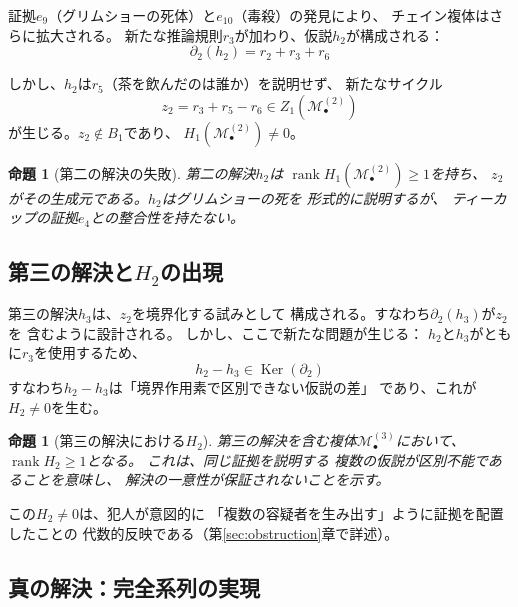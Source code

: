 \documentclass[12pt,twocolumn]{ltjsarticle}
\newtheorem{proposition}[theorem]{命題}
\newcommand{\Ker}{\operatorname{Ker}}
\renewcommand{\rank}{\operatorname{rank}}
\newcommand{\Mys}{\mathcal{M}}
\begin{document}
証拠$e_9$（グリムショーの死体）と$e_{10}$（毒殺）の発見により、
チェイン複体はさらに拡大される。
新たな推論規則$r_3$が加わり、仮説$h_2$が構成される：
\begin{equation}
\partial_2(h_2) = r_2 + r_3 + r_6
\end{equation}

しかし、$h_2$は$r_5$（茶を飲んだのは誰か）を説明せず、
新たなサイクル
\begin{equation}
z_2 = r_3 + r_5 - r_6 \in Z_1(\Mys^{(2)}_\bullet)
\end{equation}
が生じる。$z_2 \notin B_1$であり、
$H_1(\Mys^{(2)}_\bullet) \neq 0$。

\begin{proposition}[第二の解決の失敗]
\label{prop:second_failure}
第二の解決$h_2$は
$\rank H_1(\Mys^{(2)}_\bullet) \geq 1$を持ち、
$z_2$がその生成元である。$h_2$はグリムショーの死を
形式的に説明するが、
ティーカップの証拠$e_4$との整合性を持たない。
\end{proposition}

\subsection{第三の解決と$H_2$の出現}

第三の解決$h_3$は、$z_2$を境界化する試みとして
構成される。すなわち$\partial_2(h_3)$が$z_2$を
含むように設計される。
しかし、ここで新たな問題が生じる：
$h_2$と$h_3$がともに$r_3$を使用するため、
\begin{equation}
h_2 - h_3 \in \Ker(\partial_2)
\end{equation}
すなわち$h_2 - h_3$は「境界作用素で区別できない仮説の差」
であり、これが$H_2 \neq 0$を生む。

\begin{proposition}[第三の解決における$H_2$]
\label{prop:third_failure}
第三の解決を含む複体$\Mys^{(3)}_\bullet$において、
$\rank H_2 \geq 1$となる。
これは、同じ証拠を説明する
複数の仮説が区別不能であることを意味し、
\emph{解決の一意性}が保証されないことを示す。
\end{proposition}

この$H_2 \neq 0$は、犯人が意図的に
「複数の容疑者を生み出す」ように証拠を配置したことの
代数的反映である（第\ref{sec:obstruction}章で詳述）。

\subsection{真の解決：完全系列の実現}
\end{document}
